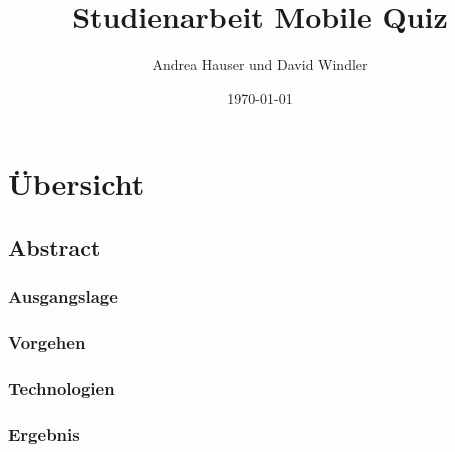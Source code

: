 \documentclass[12pt, a4paper]{report}
\date{\today}
\title{Studienarbeit Mobile Quiz}
\author{Andrea Hauser und David Windler}
\begin{document}
	
	\begin{titlepage}
		
	\end{titlepage}
	
		
	\part{Übersicht}
	
	
	\chapter{Abstract}
	
	\section{Ausgangslage}
	
	
	\section{Vorgehen}
	
	
	\section{Technologien}
	
	
	
	\section{Ergebnis}
	
	
	
	
	
\end{document}
